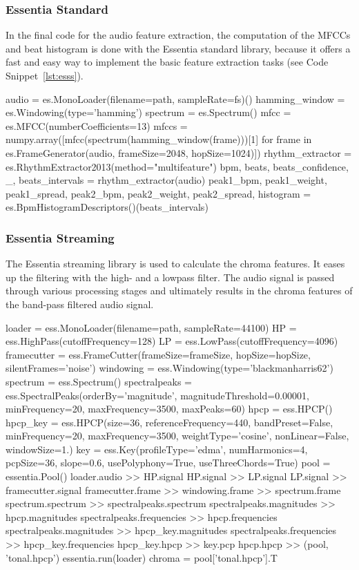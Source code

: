 \subsubsection{Essentia Standard}

In the final code for the audio feature extraction, the computation of the MFCCs and beat histogram is done with the Essentia standard library, because it offers a fast and easy way to implement the basic feature extraction tasks (see Code Snippet~\ref{lst:esss}). 
\begin{pythonCode}[frame=single,label={lst:esss},caption={Essentia standard},captionpos=b]
audio = es.MonoLoader(filename=path, sampleRate=fs)()
hamming_window = es.Windowing(type='hamming')
spectrum = es.Spectrum()
mfcc = es.MFCC(numberCoefficients=13)
mfccs = numpy.array([mfcc(spectrum(hamming_window(frame)))[1] 
	for frame in es.FrameGenerator(audio, frameSize=2048, hopSize=1024)])
rhythm_extractor = es.RhythmExtractor2013(method="multifeature")
bpm, beats, beats_confidence, _, beats_intervals = rhythm_extractor(audio)
peak1_bpm, peak1_weight, peak1_spread, peak2_bpm, peak2_weight, peak2_spread, histogram =
	es.BpmHistogramDescriptors()(beats_intervals)
\end{pythonCode}

\subsubsection{Essentia Streaming}

The Essentia streaming library is used to calculate the chroma features. It eases up the filtering with the high- and a lowpass filter. The audio signal is passed through various processing stages and ultimately results in the chroma features of the band-pass filtered audio signal. 
\begin{pythonCode}[frame=single,label={lst:essst},caption={Essentia streaming},captionpos=b]
loader = ess.MonoLoader(filename=path, sampleRate=44100)
HP = ess.HighPass(cutoffFrequency=128)
LP = ess.LowPass(cutoffFrequency=4096)
framecutter = ess.FrameCutter(frameSize=frameSize, hopSize=hopSize, silentFrames='noise')
windowing = ess.Windowing(type='blackmanharris62')
spectrum = ess.Spectrum()
spectralpeaks = ess.SpectralPeaks(orderBy='magnitude', magnitudeThreshold=0.00001, minFrequency=20, maxFrequency=3500, maxPeaks=60)
hpcp = ess.HPCP()
hpcp_key = ess.HPCP(size=36, referenceFrequency=440, bandPreset=False, minFrequency=20, maxFrequency=3500, weightType='cosine', nonLinear=False, windowSize=1.)
key = ess.Key(profileType='edma', numHarmonics=4, pcpSize=36, slope=0.6, usePolyphony=True, useThreeChords=True)
pool = essentia.Pool()
loader.audio >> HP.signal
HP.signal >> LP.signal
LP.signal >> framecutter.signal    
framecutter.frame >> windowing.frame >> spectrum.frame
spectrum.spectrum >> spectralpeaks.spectrum
spectralpeaks.magnitudes >> hpcp.magnitudes
spectralpeaks.frequencies >> hpcp.frequencies
spectralpeaks.magnitudes >> hpcp_key.magnitudes
spectralpeaks.frequencies >> hpcp_key.frequencies
hpcp_key.hpcp >> key.pcp
hpcp.hpcp >> (pool, 'tonal.hpcp')
essentia.run(loader)
chroma = pool['tonal.hpcp'].T
\end{pythonCode}	

